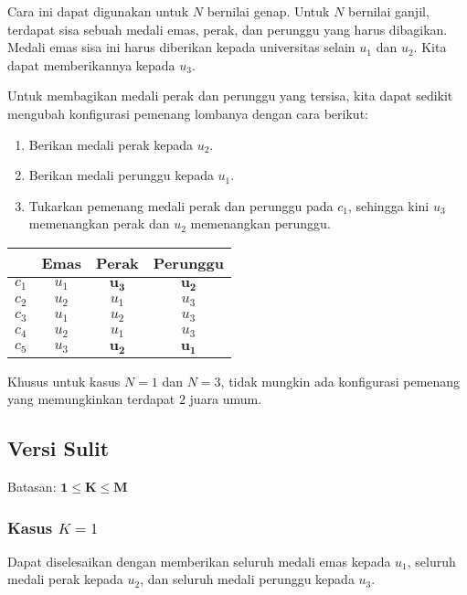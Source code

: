 \documentclass[../main_editorial.tex]{subfiles} %
\begin{document}
Cara ini dapat digunakan untuk $N$ bernilai genap. Untuk $N$ bernilai ganjil, terdapat sisa sebuah medali emas, perak, dan perunggu yang harus dibagikan. Medali emas sisa ini harus diberikan kepada universitas selain $u_1$ dan $u_2$. Kita dapat memberikannya kepada $u_3$.

Untuk membagikan medali perak dan perunggu yang tersisa, kita dapat sedikit mengubah konfigurasi pemenang lombanya dengan cara berikut:
\begin{enumerate}
  \item Berikan medali perak kepada $u_2$.
  \item Berikan medali perunggu kepada $u_1$.
  \item Tukarkan pemenang medali perak dan perunggu pada $c_1$, sehingga kini $u_3$ memenangkan perak dan $u_2$ memenangkan perunggu.
\end{enumerate}

\begin{table}[!h]
\centering
\begin{tabular}{|c||c|c|c|}
\hline  & Emas & Perak & Perunggu \\ 
\hline $c_1$ & $u_1$ & $\mathbf{u_3}$ & $\mathbf{u_2}$ \\ 
\hline $c_2$ & $u_2$ & $u_1$ & $u_3$ \\ 
\hline $c_3$ & $u_1$ & $u_2$ & $u_3$ \\ 
\hline $c_4$ & $u_2$ & $u_1$ & $u_3$ \\ 
\hline $c_5$ & $u_3$ & $\mathbf{u_2}$ & $\mathbf{u_1}$ \\ 
\hline 
\end{tabular} 
\end{table}

Khusus untuk kasus $N=1$ dan $N=3$, tidak mungkin ada konfigurasi pemenang yang memungkinkan terdapat $2$ juara umum.

\subsection*{Versi Sulit}

Batasan: $\mathbf{1 \le K \le M}$

\subsubsection*{Kasus $K = 1$}
Dapat diselesaikan dengan memberikan seluruh medali emas kepada $u_1$, seluruh medali perak kepada $u_2$, dan seluruh medali perunggu kepada $u_3$.
\end{document}
